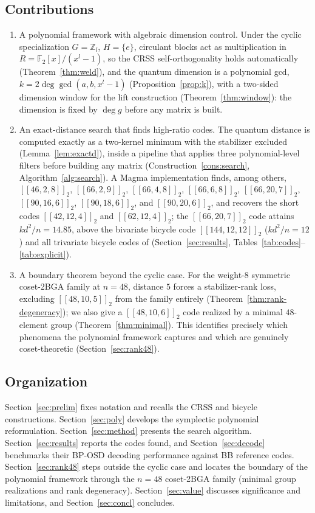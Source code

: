 \documentclass[journal,onecolumn]{IEEEtran}
\theoremstyle{definition}
\theoremstyle{remark}
\newcommand{\F}{\mathbb{F}}
\newcommand{\Z}{\mathbb{Z}}
\begin{document}
\subsection{Contributions}
\begin{enumerate}[leftmargin=2em,label=(\arabic*)]
  \item A polynomial framework with algebraic dimension control. Under the
  cyclic specialization $G=\Z_l$, $H=\{e\}$, circulant blocks act as
  multiplication in $R=\F_2[x]/(x^l-1)$, so the CRSS self-orthogonality
  holds automatically (Theorem~\ref{thm:weld}), and the quantum dimension
  is a polynomial gcd, $k=2\deg\gcd(a,b,x^l-1)$
  (Proposition~\ref{prop:k}), with a two-sided dimension window for the
  lift construction (Theorem~\ref{thm:window}): the dimension is fixed by
  $\deg g$ before any matrix is built.
  \item An exact-distance search that finds high-ratio codes. The quantum
  distance is computed exactly as a two-kernel minimum with the stabilizer
  excluded (Lemma~\ref{lem:exactd}), inside a pipeline that applies three
  polynomial-level filters before building any matrix
  (Construction~\ref{cons:search}, Algorithm~\ref{alg:search}). A Magma
  implementation finds, among others, $[[46,2,8]]_2$, $[[66,2,9]]_2$,
  $[[66,4,8]]_2$, $[[66,6,8]]_2$, $[[66,20,7]]_2$, $[[90,16,6]]_2$,
  $[[90,18,6]]_2$, and $[[90,20,6]]_2$, and recovers the short codes
  $[[42,12,4]]_2$ and $[[62,12,4]]_2$; the $[[66,20,7]]_2$ code attains
  $kd^2/n=14.85$, above the bivariate bicycle code $[[144,12,12]]_2$
  ($kd^2/n=12$) and all trivariate bicycle codes of \cite{ITB}
  (Section~\ref{sec:results}, Tables~\ref{tab:codes}--\ref{tab:explicit}).
  \item A boundary theorem beyond the cyclic case. For the weight-$8$
  symmetric coset-2BGA family at $n=48$, distance $5$ forces a
  stabilizer-rank loss, excluding $[[48,10,5]]_2$ from the family entirely
  (Theorem~\ref{thm:rank-degeneracy}); we also give a $[[48,10,6]]_2$ code
  realized by a minimal $48$-element group (Theorem~\ref{thm:minimal}).
  This identifies precisely which phenomena the polynomial framework
  captures and which are genuinely coset-theoretic
  (Section~\ref{sec:rank48}).
\end{enumerate}

\subsection{Organization}
Section~\ref{sec:prelim} fixes notation and recalls the CRSS and bicycle
constructions. Section~\ref{sec:poly} develops the symplectic polynomial
reformulation. Section~\ref{sec:method} presents the search algorithm.
Section~\ref{sec:results} reports the codes found, and
Section~\ref{sec:decode} benchmarks their BP-OSD decoding performance
against BB reference codes. Section~\ref{sec:rank48} steps outside the
cyclic case and locates the boundary of the polynomial framework through
the $n=48$ coset-2BGA family (minimal group realizations and rank
degeneracy). Section~\ref{sec:value} discusses significance and
limitations, and Section~\ref{sec:concl} concludes.
\end{document}

